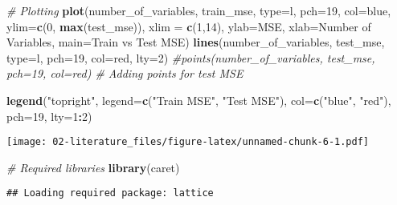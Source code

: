 \documentclass[
]{article}
\newenvironment{Shaded}{\begin{snugshade}}{\end{snugshade}}
\newcommand{\AttributeTok}[1]{\textcolor[rgb]{0.13,0.29,0.53}{#1}}
\newcommand{\CommentTok}[1]{\textcolor[rgb]{0.56,0.35,0.01}{\textit{#1}}}
\newcommand{\DecValTok}[1]{\textcolor[rgb]{0.00,0.00,0.81}{#1}}
\newcommand{\FunctionTok}[1]{\textcolor[rgb]{0.13,0.29,0.53}{\textbf{#1}}}
\newcommand{\NormalTok}[1]{#1}
\newcommand{\SpecialCharTok}[1]{\textcolor[rgb]{0.81,0.36,0.00}{\textbf{#1}}}
\newcommand{\StringTok}[1]{\textcolor[rgb]{0.31,0.60,0.02}{#1}}
\begin{document}
\begin{Shaded}
\begin{Highlighting}[]
\CommentTok{\# Plotting}
\FunctionTok{plot}\NormalTok{(number\_of\_variables, train\_mse, }\AttributeTok{type=}\StringTok{\textquotesingle{}l\textquotesingle{}}\NormalTok{, }\AttributeTok{pch=}\DecValTok{19}\NormalTok{, }\AttributeTok{col=}\StringTok{\textquotesingle{}blue\textquotesingle{}}\NormalTok{, }\AttributeTok{ylim=}\FunctionTok{c}\NormalTok{(}\DecValTok{0}\NormalTok{, }\FunctionTok{max}\NormalTok{(test\_mse)), }\AttributeTok{xlim =} \FunctionTok{c}\NormalTok{(}\DecValTok{1}\NormalTok{,}\DecValTok{14}\NormalTok{), }\AttributeTok{ylab=}\StringTok{\textquotesingle{}MSE\textquotesingle{}}\NormalTok{, }\AttributeTok{xlab=}\StringTok{\textquotesingle{}Number of Variables\textquotesingle{}}\NormalTok{, }\AttributeTok{main=}\StringTok{\textquotesingle{}Train vs Test MSE\textquotesingle{}}\NormalTok{)}
\FunctionTok{lines}\NormalTok{(number\_of\_variables, test\_mse, }\AttributeTok{type=}\StringTok{\textquotesingle{}l\textquotesingle{}}\NormalTok{, }\AttributeTok{pch=}\DecValTok{19}\NormalTok{, }\AttributeTok{col=}\StringTok{\textquotesingle{}red\textquotesingle{}}\NormalTok{, }\AttributeTok{lty=}\DecValTok{2}\NormalTok{)}
\CommentTok{\#points(number\_of\_variables, test\_mse, pch=19, col=\textquotesingle{}red\textquotesingle{}) \# Adding points for test MSE}

\FunctionTok{legend}\NormalTok{(}\StringTok{"topright"}\NormalTok{, }\AttributeTok{legend=}\FunctionTok{c}\NormalTok{(}\StringTok{"Train MSE"}\NormalTok{, }\StringTok{"Test MSE"}\NormalTok{), }\AttributeTok{col=}\FunctionTok{c}\NormalTok{(}\StringTok{"blue"}\NormalTok{, }\StringTok{"red"}\NormalTok{), }\AttributeTok{pch=}\DecValTok{19}\NormalTok{, }\AttributeTok{lty=}\DecValTok{1}\SpecialCharTok{:}\DecValTok{2}\NormalTok{)}
\end{Highlighting}
\end{Shaded}

\texttt{[image: 02-literature\_files/figure-latex/unnamed-chunk-6-1.pdf]}

\begin{Shaded}
\begin{Highlighting}[]
\CommentTok{\# Required libraries}
\FunctionTok{library}\NormalTok{(caret)}
\end{Highlighting}
\end{Shaded}

\begin{verbatim}
## Loading required package: lattice
\end{verbatim}
\end{document}
